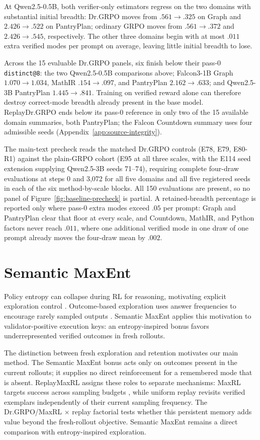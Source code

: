 At Qwen2.5-0.5B, both verifier-only
estimators regress on the two domains with substantial initial breadth:
Dr.GRPO moves from $.561\to.325$ on Graph and $2.426\to.522$ on PantryPlan;
ordinary GRPO moves from $.561\to.372$ and $2.426\to.545$, respectively.
The other three domains begin with at most $.011$ extra verified modes per
prompt on average, leaving little initial breadth to lose.

Across the 15 evaluable Dr.GRPO panels, six finish below their pass-0
\texttt{distinct@8}: the two Qwen2.5-0.5B comparisons above; Falcon3-1B Graph
$1.070\to1.034$, MathIR $.154\to.097$, and PantryPlan $2.162\to.633$; and
Qwen2.5-3B PantryPlan $1.445\to.841$. Training on verified reward alone can
therefore destroy correct-mode breadth already present in the base model.
ReplayDr.GRPO ends below its pass-0 reference in only two of the 15 available
domain summaries, both PantryPlan; the Falcon Countdown summary uses four
admissible seeds (Appendix~\ref{app:source-integrity}).

The main-text precheck reads the matched Dr.GRPO controls (E78, E79,
E80-R1) against the plain-GRPO cohort (E95 at all three scales, with the E114
seed extension supplying Qwen2.5-3B seeds 71--74), requiring complete four-draw
evaluations at steps 0 and 3,072 for all five domains and all five registered
seeds in each of the six method-by-scale blocks. All 150 evaluations are present, so no
panel of Figure~\ref{fig:baseline-precheck} is partial. A retained-breadth
percentage is reported only where pass-0 extra modes exceed $.05$ per prompt:
Graph and PantryPlan clear that floor at every scale, and Countdown, MathIR,
and Python factors never reach $.011$, where one additional verified mode in
one draw of one prompt already moves the four-draw mean by $.002$.

\section{Semantic MaxEnt}
\label{app:semantic-maxent}

Policy entropy can collapse during RL for reasoning, motivating explicit
exploration control \citep{cui2025entropy}. Outcome-based exploration uses
answer frequencies to encourage rarely sampled outputs
\citep{song2025outcome}. Semantic MaxEnt applies this motivation to
validator-positive execution keys: an entropy-inspired bonus favors
underrepresented verified outcomes in fresh rollouts.

The distinction between fresh exploration and retention motivates our main
method. The Semantic MaxEnt bonus acts only on outcomes present in the current
rollouts; it supplies no direct reinforcement for a remembered mode that is
absent. ReplayMaxRL assigns these roles to separate mechanisms: MaxRL targets
success across sampling budgets \citep{tajwar2026maxrl}, while uniform replay
revisits verified exemplars independently of their current sampling frequency.
The Dr.GRPO/MaxRL $\times$ replay factorial tests whether this persistent
memory adds value beyond the fresh-rollout objective. Semantic MaxEnt remains
a direct comparison with entropy-inspired exploration.

